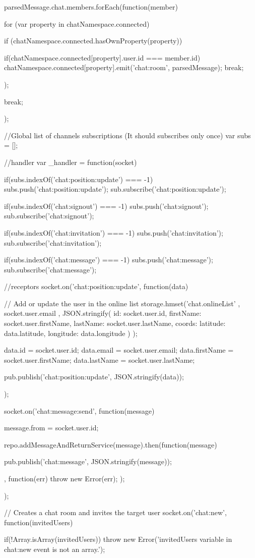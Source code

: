 \begin{flushleft}
{{{			parsedMessage.chat.members.forEach(function(member) {
				for (var property in chatNamespace.connected) {
					if (chatNamespace.connected.hasOwnProperty(property)) {
						
						if(chatNamespace.connected[property].user.id === member.id) {
							chatNamespace.connected[property].emit('chat:room', parsedMessage);
							break;
						}
					}
				}
			});
			
			break;
		}
		
	});
	
}

//Global list of channels subscriptions (It should subscribes only once)
var subs = [];

//handler
var \_handler = function(socket) {
	if(subs.indexOf('chat:position:update') === -1) {
		subs.push('chat:position:update');
		sub.subscribe('chat:position:update');
	}
	
	if(subs.indexOf('chat:signout') === -1) {
		subs.push('chat:signout');
		sub.subscribe('chat:signout');
	}
	
	if(subs.indexOf('chat:invitation') === -1) {
		subs.push('chat:invitation');
		sub.subscribe('chat:invitation');
	}
	
	if(subs.indexOf('chat:message') === -1) {
		subs.push('chat:message');
		sub.subscribe('chat:message');
	}
	
	//receptors
	socket.on('chat:position:update', function(data) {
		// Add or update the user in the online list
		storage.hmset('chat.onlineList'
		, socket.user.email
		, JSON.stringify({
			id: socket.user.id,
			firstName: socket.user.firstName,
			lastName: socket.user.lastName,
			coords: {
				latitude: data.latitude,
				longitude: data.longitude
			}
		})
		);
		
		data.id = socket.user.id;
		data.email = socket.user.email;
		data.firstName = socket.user.firstName;
		data.lastName = socket.user.lastName;
		
		pub.publish('chat:position:update', JSON.stringify(data));
	});
	
	socket.on('chat:message:send', function(message) {
		message.from = socket.user.id;
		
		repo.addMessageAndReturnService(message).then(function(message) {
			pub.publish('chat:message', JSON.stringify(message));
			
		}, function(err) { throw new Error(err); });
		
	});
	
	// Creates a chat room and invites the target user
	socket.on('chat:new', function(invitedUsers) {
		if(!Array.isArray(invitedUsers))
		throw new Error('invitedUsers variable in chat:new event is not an array.');
		
}}
\end{flushleft}
